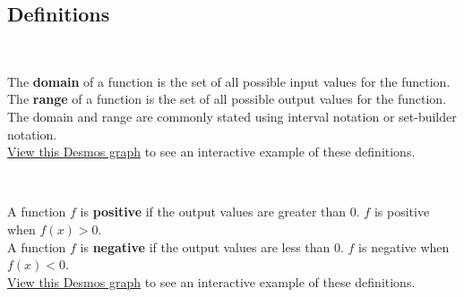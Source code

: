\newpage

\subsection*{Definitions} \label{def-functions-domain-range-behavior}

\begin{myDefinition}~\\[0.5mm]
\begin{minipage}{0.9\linewidth}
The {\bf domain} of a function is the set of all possible input values for the function.\\
The {\bf range} of a function is the set of all possible output values for the function.\\
The domain and range are commonly stated using interval notation or set-builder notation.\\[0.4em]
 \href{https://tiny.cc/111Z-DomRang}{View this Desmos graph} to see an interactive example of these definitions.  %
\end{minipage}
\begin{minipage}{0.1\linewidth}
\flushright {}
\end{minipage}
\end{myDefinition}


\begin{myDefinition}~\\[0.5mm]
\begin{minipage}{0.9\linewidth}
A function $f$ is {\bf positive} if the output values are greater than 0.  $f$ is positive when $f(x)>0$.\\
A function $f$ is {\bf negative} if the output values are less than 0. $f$ is negative  when $f(x)<0$.\\[0.4em]
 \href{https://tiny.cc/111Z-PosNeg}{View this Desmos graph} to see an interactive example of these definitions.  %
\end{minipage}
\begin{minipage}{0.1\linewidth}
\flushright {}
\end{minipage}

\end{myDefinition}

